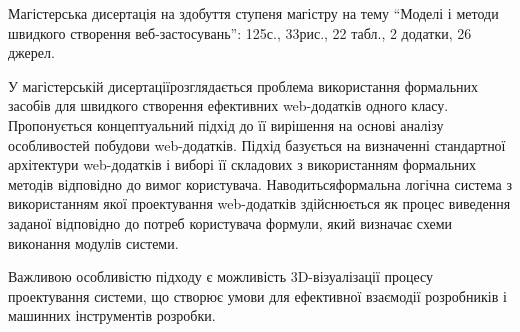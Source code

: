 \documentclass{lib/styles/default-style}
\begin{document}
Магістерська дисертація на здобуття ступеня магістру на тему “Моделі і  методи  швидкого  створення  веб-застосувань”: 125с., 33рис.,  22  табл., 2 додатки, 26 джерел.

У магістерській  дисертаціїрозглядається  проблема  використання формальних засобів для швидкого створення ефективних web-додатків одного класу. Пропонується концептуальний підхід до її вирішення на основі аналізу особливостей  побудови  web-додатків.  Підхід  базується  на  визначенні стандартної архітектури web-додатків і виборі її складових з використанням формальних методів відповідно до вимог користувача. Наводитьсяформальна логічна  система  з  використанням  якої  проектування  web-додатків здійснюється як процес виведення заданої відповідно до потреб користувача формули,  який  визначає  схеми  виконання  модулів  системи. 

Важливою особливістю  підходу  є  можливість  3D-візуалізації  процесу  проектування системи, що створює умови для ефективної взаємодії розробників і машинних інструментів розробки.
\end{document}
